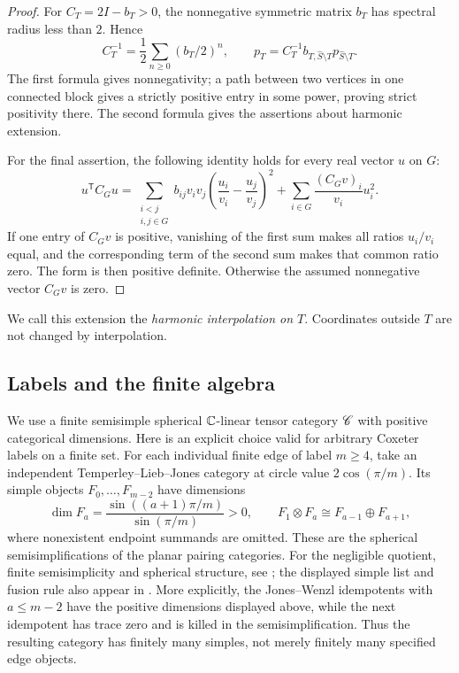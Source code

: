 \begin{proof}
For $C_T=2I-b_T>0$, the nonnegative symmetric matrix $b_T$ has
spectral radius less than $2$.  Hence
\[
 C_T^{-1}=\frac12\sum_{n\geq0}(b_T/2)^n,
 \qquad
 p_T=C_T^{-1}b_{T,\widehat S\setminus T}p_{\widehat S\setminus T}.
\]
The first formula gives nonnegativity; a path between two vertices
in one connected block gives a strictly positive entry in some
power, proving strict positivity there.  The second formula gives
the assertions about harmonic extension.

For the final assertion, the following identity holds for every
real vector $u$ on $G$:
\begin{equation}
 u^{\mathsf T}C_Gu
 =\sum_{\substack{i<j\\i,j\in G}}b_{ij}v_iv_j
       \left(\frac{u_i}{v_i}-\frac{u_j}{v_j}\right)^2
   +\sum_{i\in G}\frac{(C_Gv)_i}{v_i}u_i^2.
 \label{cat:scaled-form}
\end{equation}
If one entry of $C_Gv$ is positive, vanishing of the first sum makes
all ratios $u_i/v_i$ equal, and the corresponding term of the second
sum makes that common ratio zero.  The form is then positive
definite.  Otherwise the assumed nonnegative vector $C_Gv$ is zero.
\end{proof}

We call this extension the \emph{harmonic interpolation on $T$}.
Coordinates outside $T$ are not changed by interpolation.

\subsection{Labels and the finite algebra}

We use a finite semisimple spherical $\mathbb C$-linear tensor category
$\mathscr C$ with positive categorical dimensions.  Here is an explicit
choice valid for arbitrary Coxeter labels on a finite set.  For each individual finite
edge of label $m\geq4$, take an independent Temperley--Lieb--Jones
category at circle value $2\cos(\pi/m)$.  Its simple objects
$F_0,\ldots,F_{m-2}$ have dimensions
\[
 \dim F_a=\frac{\sin((a+1)\pi/m)}{\sin(\pi/m)}>0,
 \qquad
 F_1\otimes F_a\cong F_{a-1}\oplus F_{a+1},
\]
where nonexistent endpoint summands are omitted.  These are the
spherical semisimplifications of the planar pairing categories.
For the negligible quotient, finite semisimplicity and spherical
structure, see \cite[Sections~5.1--5.4, especially
Theorems~5.4.4--5.4.5 and the discussion following
Definition~5.4.7]{Chen2014}; the displayed simple list and fusion rule
also appear in \cite[Section~4.1, Equations~(10)--(11)]{HengLicata2024}.  More
explicitly, the Jones--Wenzl idempotents with $a\leq m-2$ have the
positive dimensions displayed above, while the next idempotent has
trace zero and is killed in the semisimplification.  Thus the
resulting category has finitely many simples, not merely finitely
many specified edge objects.

